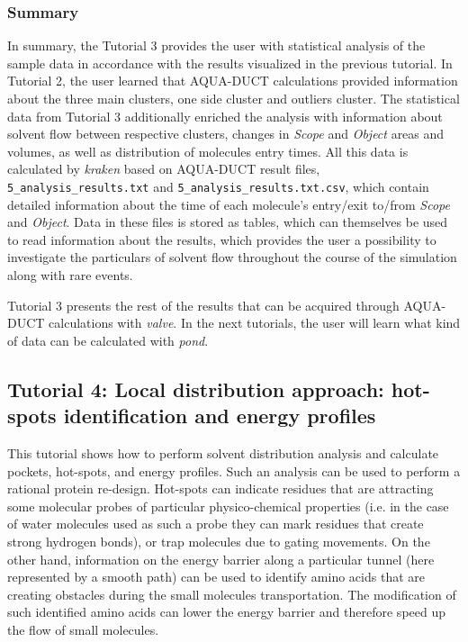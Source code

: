 \documentclass[9pt,tutorial]{livecoms}
\begin{document}
\subsubsection{Summary}
In summary, the Tutorial 3 provides the user with statistical analysis of the sample data in accordance with the results visualized in the previous tutorial. In Tutorial 2, the user learned that AQUA-DUCT calculations provided information about the three main clusters, one side cluster and outliers cluster. The statistical data from Tutorial 3 additionally enriched the analysis with information about solvent flow between respective clusters, changes in \textit{Scope} and \textit{Object} areas and volumes, as well as distribution of molecules entry times. All this data is calculated by \textit{kraken} based on AQUA-DUCT result files, \texttt{5\_analysis\_results.txt} and \texttt{5\_analysis\_results.txt.csv}, which contain detailed information about the time of each molecule's entry/exit to/from \textit{Scope} and \textit{Object}. Data in these files is stored as tables, which can themselves be used to read information about the results, which provides the user a possibility to investigate the particulars of solvent flow throughout the course of the simulation along with rare events. 

Tutorial 3 presents the rest of the results that can be acquired through AQUA-DUCT calculations with \textit{valve}. In the next tutorials, the user will learn what kind of data can be calculated with \textit{pond}.

\subsection{Tutorial 4: Local distribution approach: hot-spots identification and energy profiles}

This tutorial shows how to perform solvent distribution analysis and calculate pockets, hot-spots, and energy profiles. Such an analysis can be used to perform a rational protein re-design. Hot-spots can indicate residues that are attracting some molecular probes of particular physico-chemical properties (i.e. in the case of water molecules used as such a probe they can mark residues that create strong hydrogen bonds), or trap molecules due to gating movements. On the other hand, information on the energy barrier along a particular tunnel (here represented by a smooth path) can be used to identify amino acids that are creating obstacles during the small molecules transportation. The modification of such identified amino acids can lower the energy barrier and therefore speed up the flow of small molecules.
\end{document}
